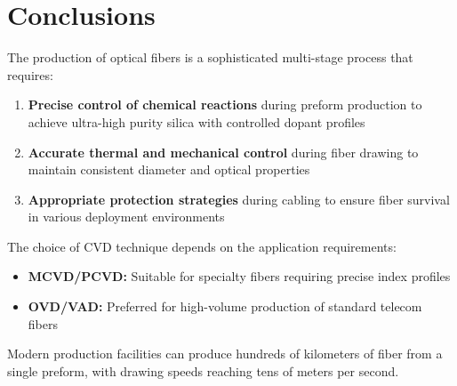 \documentclass[a4paper, 11pt]{article}
\begin{document}
\section{Conclusions}

The production of optical fibers is a sophisticated multi-stage process that requires:

\begin{enumerate}[leftmargin=*]
    \item \textbf{Precise control of chemical reactions} during preform production to achieve ultra-high purity silica with controlled dopant profiles
    
    \item \textbf{Accurate thermal and mechanical control} during fiber drawing to maintain consistent diameter and optical properties
    
    \item \textbf{Appropriate protection strategies} during cabling to ensure fiber survival in various deployment environments
\end{enumerate}

The choice of CVD technique depends on the application requirements:

\begin{itemize}
    \item \textbf{MCVD/PCVD:} Suitable for specialty fibers requiring precise index profiles
    \item \textbf{OVD/VAD:} Preferred for high-volume production of standard telecom fibers
\end{itemize}

Modern production facilities can produce hundreds of kilometers of fiber from a single preform, with drawing speeds reaching tens of meters per second.
\end{document}
